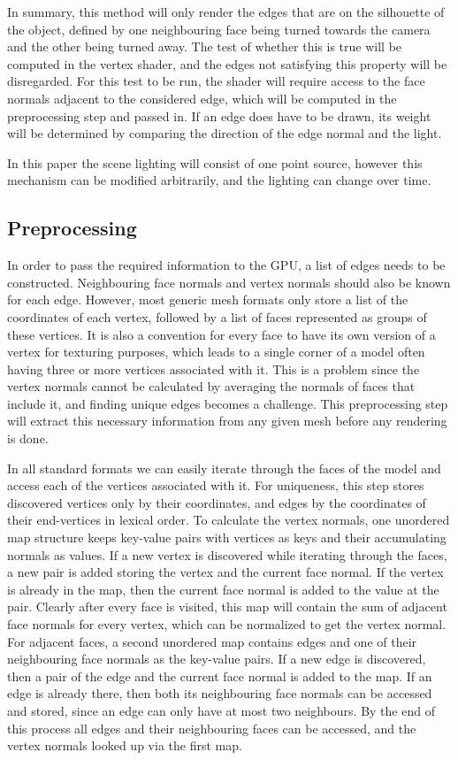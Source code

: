 \documentclass[a4paper,10pt]{article}
\begin{document}
In summary, this method will only render the edges that are on the silhouette of the object, defined by one neighbouring face being turned towards the camera and the other being turned away. The test of whether this is true will be computed in the vertex shader, and the edges not satisfying this property will be disregarded. For this test to be run, the shader will require access to the face normals adjacent to the considered edge, which will be computed in the preprocessing step and passed in. If an edge does have to be drawn, its weight will be determined by comparing the direction of the edge normal and the light.

In this paper the scene lighting will consist of one point source, however this mechanism can be modified arbitrarily, and the lighting can change over time.

\subsection{Preprocessing}
In order to pass the required information to the GPU, a list of edges needs to be constructed. Neighbouring face normals and vertex normals should also be known for each edge. However, most generic mesh formats only store a list of the coordinates of each vertex, followed by a list of faces represented as groups of these vertices. It is also a convention for every face to have its own version of a vertex for texturing purposes, which leads to a single corner of a model often having three or more vertices associated with it. This is a problem since the vertex normals cannot be calculated by averaging the normals of faces that include it, and finding unique edges becomes a challenge. This preprocessing step will extract this necessary information from any given mesh before any rendering is done.

In all standard formats we can easily iterate through the faces of the model and access each of the vertices associated with it. For uniqueness, this step stores discovered vertices only by their coordinates, and edges by the coordinates of their end-vertices in lexical order. To calculate the vertex normals, one unordered map structure keeps key-value pairs with vertices as keys and their accumulating normals as values. If a new vertex is discovered while iterating through the faces, a new pair is added storing the vertex and the current face normal. If the vertex is already in the map, then the current face normal is added to the value at the pair. Clearly after every face is visited, this map will contain the sum of adjacent face normals for every vertex, which can be normalized to get the vertex normal. For adjacent faces, a second unordered map contains edges and one of their neighbouring face normals as the key-value pairs. If a new edge is discovered, then a pair of the edge and the current face normal is added to the map. If an edge is already there, then both its neighbouring face normals can be accessed and stored, since an edge can only have at most two neighbours. By the end of this process all edges and their neighbouring faces can be accessed, and the vertex normals looked up via the first map.
\end{document}
